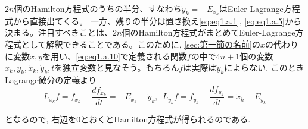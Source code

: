 \documentclass[dvipdfmx, leqno]{jsbook}
\begin{document}
    $2n$個のHamilton方程式のうちの半分、すなわち$\dot{y}_k= -E_{x_k}$はEuler-Lagrange方程式から直接出てくる。 一方、残りの半分は置き換え\eqref{eq:eq1.a.1}, \eqref{eq:eq1.a.5}から決まる。注目すべきことは、$2n$個のHamilton方程式がまとめてEuler-Lagrange方程式として解釈できることである。このために, \ref{sec:第一節の名前}の$x$の代わりに変数$x, y$を用い、\eqref{eq:eq1.a.10}で定義される関数$f$の中で$4n+ 1$個の変数$x_k, y_k, \dot{x}_k, \dot{y}_k, t$を独立変数と見なそう。もちろん$f$は実際は$\dot{y}_k$によらない. このときLagrange微分の定義より
\begin{equation}
    L_{x_k}f= f_{x_k}- \frac{df_{\dot{x}_k}}{dt}= -E_{x_k}- \dot{y}_k, \ \ L_{y_k}f= f_{y_k}- \frac{df_{\dot{y}_k}}{dt}= \dot{x}_k- E_{y_k}
\end{equation}

    となるので, 右辺を0とおくとHamilton方程式が得られるのである.
\end{document}
